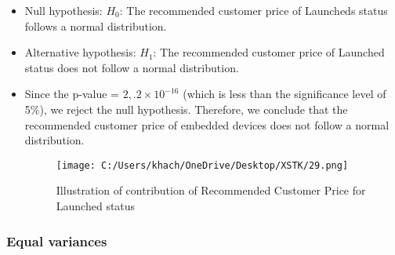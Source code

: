 \documentclass[a4paper]{article}
\begin{document}
\begin{enumerate}
		\begin{itemize}
			\item Null hypothesis:
			\( H_0 \): The recommended customer price of Launcheds status follows a normal distribution.
			\item Alternative hypothesis:
			\( H_1 \): The recommended customer price of Launched status does not follow a normal distribution.
			\item Since the p-value = \(2,.2 \times 10^{-16}\) (which is less than the significance level of 5\%), we reject the null hypothesis. Therefore, we conclude that the recommended customer price of embedded devices does not follow a normal distribution.
			\begin{figure}[htbp]
				\centering
				\begin{adjustbox}{width=0.7\textwidth, frame}
					\texttt{[image: C:/Users/khach/OneDrive/Desktop/XSTK/29.png]}
				\end{adjustbox}
				\captionsetup{justification=centering}
				\vspace{0.5cm}
				\caption{Illustration of contribution of Recommended Customer Price for Launched status}
			\end{figure}
		\end{itemize}
	\end{enumerate}
	\newpage
	\subsubsection{Equal variances}
\end{document}
